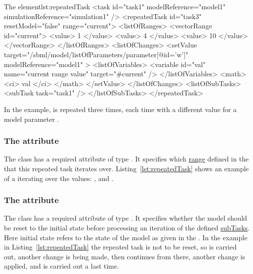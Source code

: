 
%
\begin{myXmlLst}{The  element}{lst:repeatedTask}
<task id="task1" modelReference="model1" simulationReference="simulation1" />
<repeatedTask id="task3" resetModel="false" range="current"> 
  <listOfRanges>
    <vectorRange id="current"> 
        <value> 1 </value> 
        <value> 4 </value> 
        <value> 10 </value> 
    </vectorRange> 
  </listOfRanges>
  <listOfChanges>
     <setValue target="/sbml/model/listOfParameters/parameter[@id='w']" modelReference="model1" > 
     <listOfVariables> 
         <variable id="val" name="current range value" target="#current" /> 
     </listOfVariables> 
     <math> 
         <ci> val </ci> 
     </math> 
    </setValue> 
</listOfChanges>
<listOfSubTasks>
  <subTask task="task1" />
</listOfSubTasks>
</repeatedTask>

\end{myXmlLst}
%
In the example,  is repeated three times, each time with a different value for a model parameter . 



\subsubsection{ The  attribute}
\label{sec:rangeAttribute}
The  class has a required attribute  of type . It specifies which \hyperref[class:range]{range} defined in the  that this repeated task iterates over. Listing~\ref{lst:repeatedTask} shows an example of a  iterating over the values: ,  and . 


\subsubsection{ The  attribute}
\label{sec:resetModel}
The  class has a required attribute  of type . It specifies whether the model should be reset to the initial state before processing an iteration of the defined \hyperref[class:subTasks]{subTasks}. Here initial state refers to the state of the model as given in the .  In the example in  Listing~\ref{lst:repeatedTask} the repeated task is not to be reset, so  is carried out, another change is being made, then  continues from there, another change is applied, and  is carried out a last time. 

